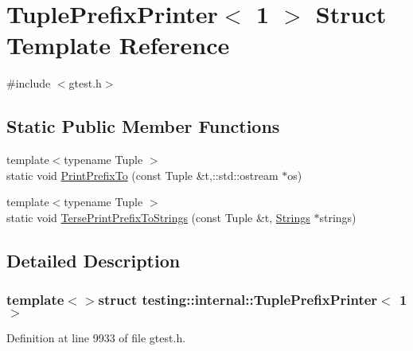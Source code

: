\hypertarget{structtesting_1_1internal_1_1TuplePrefixPrinter_3_011_01_4}{\section{\-Tuple\-Prefix\-Printer$<$ 1 $>$ \-Struct \-Template \-Reference}
\label{db/def/structtesting_1_1internal_1_1TuplePrefixPrinter_3_011_01_4}
}


{\ttfamily \#include $<$gtest.\-h$>$}

\subsection*{\-Static \-Public \-Member \-Functions}
\begin{DoxyCompactItemize}
\item 
{\footnotesize template$<$typename Tuple $>$ }\\static void \hyperlink{structtesting_1_1internal_1_1TuplePrefixPrinter_3_011_01_4_a471ff2966d5382e964d52f9ad0381c0b}{\-Print\-Prefix\-To} (const \-Tuple \&t,\-::std\-::ostream $\ast$os)
\item 
{\footnotesize template$<$typename Tuple $>$ }\\static void \hyperlink{structtesting_1_1internal_1_1TuplePrefixPrinter_3_011_01_4_a74cfd757d88ad213bcb8270b0e91a305}{\-Terse\-Print\-Prefix\-To\-Strings} (const \-Tuple \&t, \hyperlink{namespacetesting_1_1internal_a6d618e88721d4c38cbecabe0d2e8341c}{\-Strings} $\ast$strings)
\end{DoxyCompactItemize}


\subsection{\-Detailed \-Description}
\subsubsection*{template$<$$>$struct testing\-::internal\-::\-Tuple\-Prefix\-Printer$<$ 1 $>$}



\-Definition at line 9933 of file gtest.\-h.



